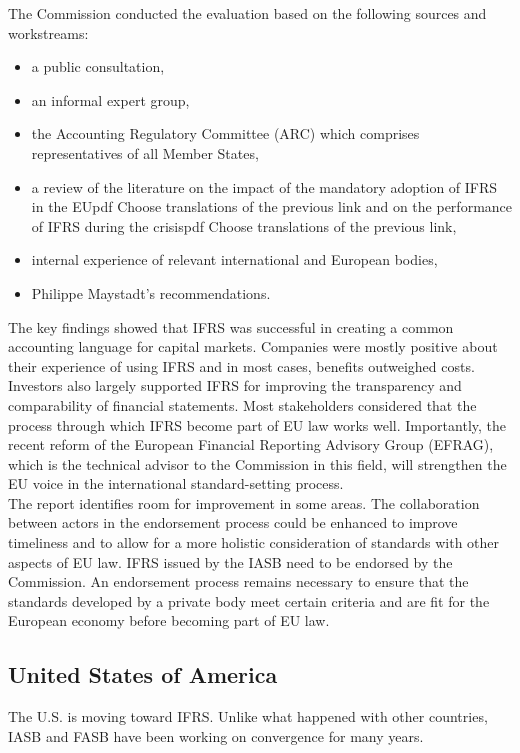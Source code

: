 The Commission conducted the evaluation based on the following sources and workstreams:
\begin{itemize}
	\item a public consultation,
	\item an informal expert group,
	\item the Accounting Regulatory Committee (ARC) which comprises representatives of all Member States,
	\item a review of the literature on the impact of the mandatory adoption of IFRS in the EUpdf Choose translations of the previous link and on the performance of IFRS during the crisispdf Choose translations of the previous link,
	\item internal experience of relevant international and European bodies,
	\item Philippe Maystadt’s recommendations.
\end{itemize}

The key findings showed that IFRS was successful in creating a common accounting language for capital markets. Companies were mostly positive about their experience of using IFRS and in most cases, benefits outweighed costs. Investors also largely supported IFRS for improving the transparency and comparability of financial statements. Most stakeholders considered that the process through which IFRS become part of EU law works well. Importantly, the recent reform of the European Financial Reporting Advisory Group (EFRAG), which is the technical advisor to the Commission in this field, will strengthen the EU voice in the international standard-setting process. \\

The report identifies room for improvement in some areas. The collaboration between actors in the endorsement process could be enhanced to improve timeliness and to allow for a more holistic consideration of standards with other aspects of EU law. IFRS issued by the IASB need to be endorsed by the Commission. An endorsement process remains necessary to ensure that the standards developed by a private body meet certain criteria and are fit for the European economy before becoming part of EU law.

\subsection{United States of America}
The U.S. is moving toward IFRS. Unlike what happened with other countries, IASB and FASB have been working on convergence for many years. \\

